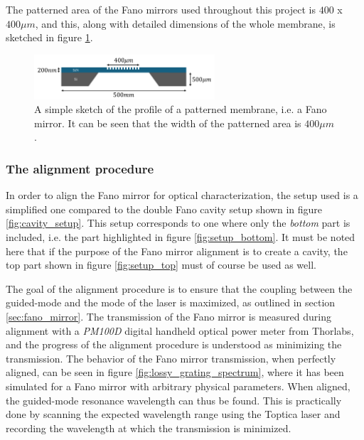 The patterned area of the Fano mirrors used throughout this project is $400$ x $400 \mu m$, and this, along with detailed dimensions of the whole membrane, is sketched in figure \ref{fig:grating_sketch}.

\begin{figure}[h!]
    \centering
    \includegraphics[width=0.6\textwidth]{figures/grating_sketch.pdf}
    \caption{A simple sketch of the profile of a patterned membrane, i.e. a Fano mirror. It can be seen that the width of the patterned area is $400\mu m$.}
    \label{fig:grating_sketch}
\end{figure}

\newpage
\subsubsection{The alignment procedure}\label{sec:alignment}

In order to align the Fano mirror for optical characterization, the setup used is a simplified one compared to the double Fano cavity setup shown in figure \ref{fig:cavity_setup}. This setup corresponds to one where only the \emph{bottom} part is included, i.e. the part highlighted in figure \ref{fig:setup_bottom}. It must be noted here that if the purpose of the Fano mirror alignment is to create a cavity, the top part shown in figure \ref{fig:setup_top} must of course be used as well. 

The goal of the alignment procedure is to ensure that the coupling between the guided-mode and the mode of the laser is maximized, as outlined in section \ref{sec:fano_mirror}. The transmission of the Fano mirror is measured during alignment with a \emph{PM100D} digital handheld optical power meter from Thorlabs\cite{power_meter}, and the progress of the alignment procedure is understood as minimizing the transmission. The behavior of the Fano mirror transmission, when perfectly aligned, can be seen in figure \ref{fig:lossy_grating_spectrum}, where it has been simulated for a Fano mirror with arbitrary physical parameters. When aligned, the guided-mode resonance wavelength can thus be found. This is practically done by scanning the expected wavelength range using the Toptica laser and recording the wavelength at which the transmission is minimized.  

